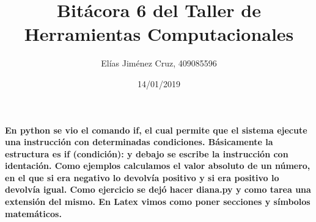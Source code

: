 \documentclass[letterpaper, 12pt, oneside]{article} %
\title{\Huge Bitácora 6 del Taller de Herramientas Computacionales}
\author{Elías Jiménez Cruz, 409085596}
\date{14/01/2019}
\begin{document}
	\maketitle
	\paragraph{En python se vio el comando if, el cual permite que el sistema ejecute una instrucción con determinadas condiciones. Básicamente la estructura es if (condición): y debajo se escribe la instrucción con identación. Como ejemplos calculamos el valor absoluto de un número, en el que si era negativo lo devolvía positivo y si era positivo lo devolvía igual. Como ejercicio se dejó hacer diana.py y como tarea una extensión del mismo. En Latex vimos como poner secciones y símbolos matemáticos.}
\end{document}
